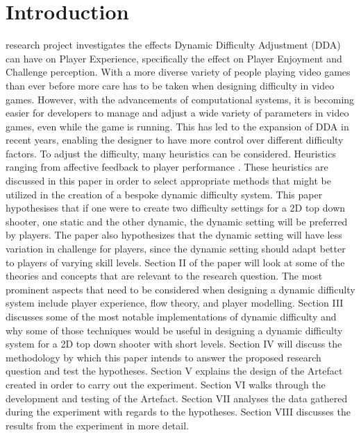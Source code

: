\documentclass[journal]{IEEEtran}
\begin{document}
\section{Introduction}
% 
% 
% 
% 
 research project investigates the effects Dynamic Difficulty Adjustment (DDA) can have on Player Experience, specifically the effect on Player Enjoyment and Challenge perception. With a more diverse variety of people playing video games than ever before \cite{juul2010casual} more care has to be taken when designing difficulty in video games. However, with the advancements of computational systems, it is becoming easier for developers to manage and adjust a wide variety of parameters in video games, even while the game is running. This has led to the expansion of DDA in recent years, enabling the designer to have more control over different difficulty factors. To adjust the difficulty, many heuristics can be considered. Heuristics ranging from affective feedback \cite{liu2009dynamic} to player performance \cite{denisova2015adaptation}. These heuristics are discussed in this paper in order to select appropriate methods that might be utilized in the creation of a bespoke dynamic difficulty system. This paper hypothesises that if one were to create two difficulty settings for a 2D top down shooter, one static and the other dynamic, the dynamic setting will be preferred by players. The paper also hypothesizes that the dynamic setting will have less variation in challenge for players, since the dynamic setting should adapt better to players of varying skill levels.
Section II of the paper will look at some of the theories and concepts that are relevant to the research question. The most prominent aspects that need to be considered when designing a dynamic difficulty system include player experience, flow theory, and player modelling. Section III discusses some of the most notable implementations of dynamic difficulty and why some of those techniques would be useful in designing a dynamic difficulty system for a 2D top down shooter with short levels. Section IV will discuss the methodology by which this paper intends to answer the proposed research question and test the hypotheses. Section V explains the design of the Artefact created in order to carry out the experiment. Section VI walks through the development and testing of the Artefact. Section VII analyses the data gathered during the experiment with regards to the hypotheses. Section VIII discusses the results from the experiment in more detail.
\end{document}

